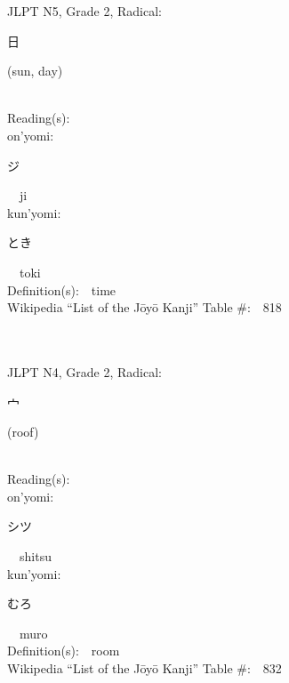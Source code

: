 \begin{multicols}{2}
{JLPT N5, Grade 2, Radical:\ \ {\begin{CJK}{UTF8}{min} 日 \end{CJK}} (sun, day) } \\
Reading(s):\ \ \\
{\hspace*{1em}}on'yomi:\ \ \\
{\hspace*{2em}}{\begin{CJK}{UTF8}{min} ジ \end{CJK}}\ \ ji\ \ \\
{\hspace*{1em}}kun'yomi:\ \ \\
{\hspace*{2em}}{\begin{CJK}{UTF8}{min} とき \end{CJK}}\ \ toki\ \ \\
Definition(s):\ \ time \\
Wikipedia ``List of the J\=oy\=o Kanji'' Table \#:\ \ 818 \\
\ \ \\
{\fontsize{34pt}{40pt}  }\ \ \\  %
{JLPT N4, Grade 2, Radical:\ \ {\begin{CJK}{UTF8}{min} 宀 \end{CJK}} (roof) } \\
Reading(s):\ \ \\
{\hspace*{1em}}on'yomi:\ \ \\
{\hspace*{2em}}{\begin{CJK}{UTF8}{min} シツ \end{CJK}}\ \ shitsu\ \ \\
{\hspace*{1em}}kun'yomi:\ \ \\
{\hspace*{2em}}{\begin{CJK}{UTF8}{min} むろ \end{CJK}}\ \ muro\ \ \\
Definition(s):\ \ room \\
Wikipedia ``List of the J\=oy\=o Kanji'' Table \#:\ \ 832 \\
\ \ \\
{\fontsize{34pt}{40pt}  }\ \ \\  %

\end{multicols}
